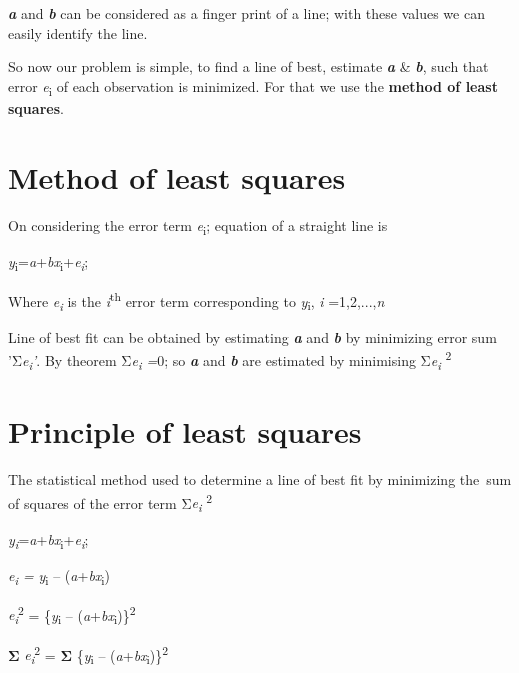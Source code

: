 \documentclass[
]{book}
\begin{document}
\textbf{\emph{a}} and \textbf{\emph{b}} can be considered as a finger print of a line; with
these values we can easily identify the line.

So now our problem is simple, to find a line of best, estimate \textbf{\emph{a}} \&
\textbf{\emph{b}}, such that error \emph{e}\textsubscript{i} of each observation is minimized. For
that we use the \textbf{method of least squares}.

\hypertarget{method-of-least-squares}{%
\section{Method of least squares}\label{method-of-least-squares}}

On considering the error term \emph{e}\textsubscript{i}; equation of a straight line is

\emph{y}\textsubscript{i}=\emph{a}+\emph{bx}\textsubscript{i}+\emph{e\textsubscript{i}};

Where \emph{e\textsubscript{i}} is the \emph{i}\textsuperscript{th} error term corresponding to \emph{y}\textsubscript{i}, \emph{i}
=1,2,...,\emph{n}

Line of best fit can be obtained by estimating \textbf{\emph{a}} and \textbf{\emph{b}} by
minimizing error sum 'Σ\emph{e\textsubscript{i}'}. By theorem Σ\emph{e\textsubscript{i} =}0; so \textbf{\emph{a}} and
\textbf{\emph{b}} are estimated by minimising Σ\emph{e\textsubscript{i}} \textsuperscript{2}

\hypertarget{principle-of-least-squares}{%
\section{Principle of least squares}\label{principle-of-least-squares}}

The statistical method used to determine
a line of best fit by minimizing the~sum of squares of the error term
Σ\emph{e\textsubscript{i}} \textsuperscript{2}

\emph{y\textsubscript{i}}=\emph{a}+\emph{bx}\textsubscript{i}+\emph{e\textsubscript{i}};

\emph{e\textsubscript{i} =} \emph{y}\textsubscript{i} -- (\emph{a}+\emph{bx}\textsubscript{i})

\emph{e\textsubscript{i}}\textsuperscript{2} = \{\emph{y}\textsubscript{i} -- (\emph{a}+\emph{bx}\textsubscript{i})\}\textsuperscript{2}

\textbf{Σ} \emph{e\textsubscript{i}}\textsuperscript{2} = \textbf{Σ} \{\emph{y}\textsubscript{i} -- (\emph{a}+\emph{bx}\textsubscript{i})\}\textsuperscript{2}
\end{document}
